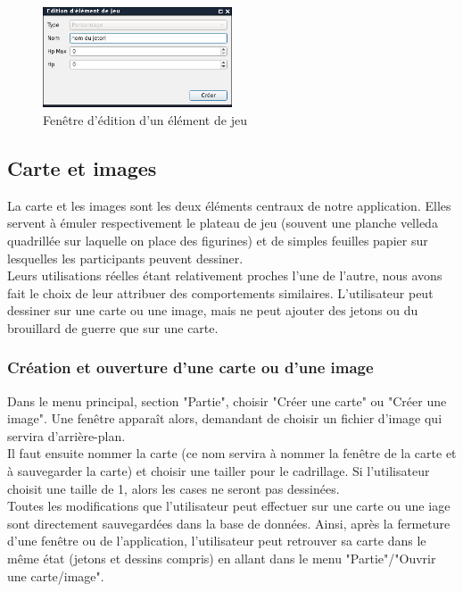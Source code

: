 \begin{figure}[h!]
	\centering
	\includegraphics[width=0.5\textwidth]{img/gameobject_edit.png}
	\caption{Fenêtre d'édition d'un élément de jeu}
	\label{fig:gameobject_edit}
\end{figure}
\newpage

\subsection{Carte et images}

La carte et les images sont les deux éléments centraux de notre application. Elles servent à émuler respectivement le plateau de jeu (souvent une planche velleda quadrillée sur laquelle on place des figurines) et de simples feuilles papier sur lesquelles les participants peuvent dessiner.\\
Leurs utilisations réelles étant relativement proches l'une de l'autre, nous avons fait le choix de leur attribuer des comportements similaires. L'utilisateur peut dessiner sur une carte ou une image, mais ne peut ajouter des jetons ou du brouillard de guerre que sur une carte.

\subsubsection{Création et ouverture d'une carte ou d'une image}

Dans le menu principal, section "Partie", choisir "Créer une carte" ou "Créer une image". Une fenêtre apparaît alors, demandant de choisir un fichier d'image qui servira d'arrière-plan. \\
Il faut ensuite nommer la carte (ce nom servira à nommer la fenêtre de la carte et à sauvegarder la carte) et choisir une tailler pour le cadrillage. Si l'utilisateur choisit une taille de 1, alors les cases ne seront pas dessinées.\\

Toutes les modifications que l'utilisateur peut effectuer sur une carte ou une iage sont directement sauvegardées dans la base de données. Ainsi, après la fermeture d'une fenêtre ou de l'application, l'utilisateur peut retrouver sa carte dans le même état (jetons et dessins compris) en allant dans le menu "Partie"/"Ouvrir une carte/image".

